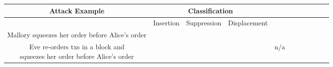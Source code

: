 



\begin{table*}[t]
\centering
\begin{tabular}{|c|c|c|c|c|c|c|c|c|c|c|}


\multicolumn{1}{c}{\textbf{Attack Example}} & 
\multicolumn{3}{c}{\textbf{Classification}} & 


\headrow{Centralized Exchange} &
\headrow{DEX w/ Off-chain Order Book} & 
\headrow{DEX w/ Roll-up} & 
\headrow{On-chain Continuous Market} &
\headrow{On-chain Automated Market Making} & 
\headrow{On-chain Call Market (\cm)} & 
\headrow{On-chain Call Market w/ Roll-up (\cm variant)}  \\ \hline

	\multicolumn{1}{|c|}{}                      								&\multicolumn{1}{c|}{Insertion}         &\multicolumn{1}{c|}{Suppression}		&\multicolumn{1}{c|}{Displacement}  													&\multicolumn{7}{c|}{}       										 \\ \hline
Mallory squeezes her order before Alice's order      								&\checkmark 		&					&														&\empt			&\empt			&\empt			&\empt			&\empt			&\full		&\full					\\ \hline						 											
\shortstack{Eve re-orders txs in a block and \\squeezes her order before Alice's order }			&\checkmark 		&					&\checkmark 											&n/a			&\empt			&\empt			&\empt			&\empt			&\full		&\full				\\ \hline

\end{tabular}
\end{table*}
